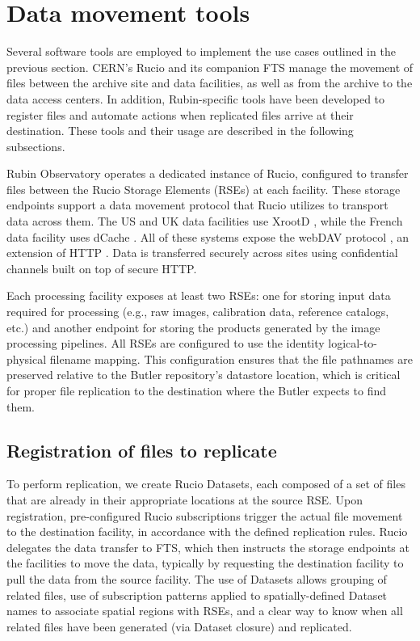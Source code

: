 \documentclass{webofc}
\begin{document}
\section{Data movement tools}
\label{section-data-movement-tools}

Several software tools are employed to implement the use cases outlined in the previous section. CERN's Rucio \cite{rucio2019} and its companion FTS \cite{FTS} manage the movement of files between the archive site and data facilities, as well as from the archive to the data access centers. In addition, Rubin-specific tools have been developed to register files and automate actions when replicated files arrive at their destination. These tools and their usage are described in the following subsections.

Rubin Observatory operates a dedicated instance of Rucio, configured to transfer files between the Rucio Storage Elements (RSEs) at each facility. These storage endpoints support a data movement protocol that Rucio utilizes to transport data across them. The US and UK data facilities use XrootD \cite{xrootd}, while the French data facility uses dCache \cite{dCache}. All of these systems expose the webDAV protocol \cite{webdav}, an extension of HTTP \cite{http1.1}. Data is transferred securely across sites using confidential channels built on top of secure HTTP.

Each processing facility exposes at least two RSEs: one for storing input data required for processing (e.g., raw images, calibration data, reference catalogs, etc.) and another endpoint for storing the products generated by the image processing pipelines. All RSEs are configured to use the identity logical-to-physical filename mapping. This configuration ensures that the file pathnames are preserved relative to the Butler repository's datastore location, which is critical for proper file replication to the destination where the Butler expects to find them.

\subsection{Registration of files to replicate}
\label{registration}

To perform replication, we create Rucio Datasets, each composed of a set of files that are already in their appropriate locations at the source RSE. Upon registration, pre-configured Rucio subscriptions trigger the actual file movement to the destination facility, in accordance with the defined replication rules. Rucio delegates the data transfer to FTS, which then instructs the storage endpoints at the facilities to move the data, typically by requesting the destination facility to pull the data from the source facility. The use of Datasets allows grouping of related files, use of subscription patterns applied to spatially-defined Dataset names to associate spatial regions with RSEs, and a clear way to know when all related files have been generated (via Dataset closure) and replicated.
\end{document}
